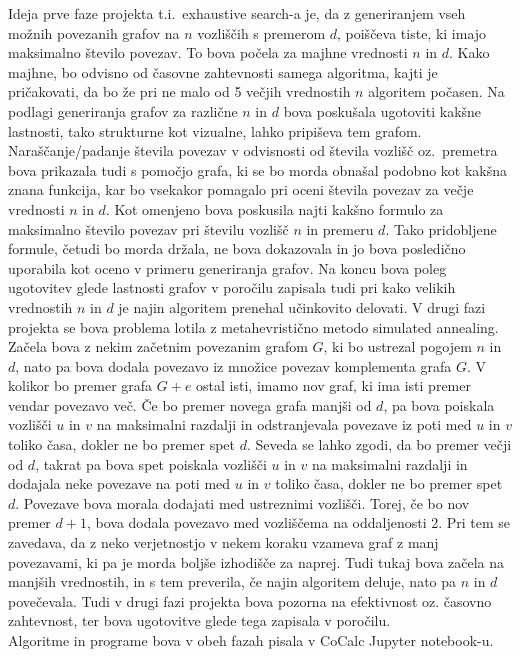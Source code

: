 \documentclass[12pt,a4paper]{amsart}
\theoremstyle{definition} %
\theoremstyle{plain} %
\begin{document}
Ideja prve faze projekta t.i.\ exhaustive search-a je, da z generiranjem vseh možnih povezanih grafov na $n$ vozliščih s premerom $d$, 
poiščeva tiste, ki imajo maksimalno število povezav. To bova počela za majhne vrednosti $n$ in $d$. Kako majhne, bo odvisno od časovne 
zahtevnosti samega algoritma, kajti je pričakovati, da bo že pri ne malo od 5 večjih vrednostih $n$ algoritem počasen. Na podlagi 
generiranja grafov za različne $n$ in $d$ bova poskušala ugotoviti kakšne lastnosti, tako strukturne kot vizualne, lahko pripiševa 
tem grafom. Naraščanje/padanje števila povezav v odvisnosti od števila vozlišč oz.\ premetra bova prikazala tudi s pomočjo grafa, 
ki se bo morda obnašal podobno kot kakšna znana funkcija, kar bo vsekakor pomagalo pri oceni števila povezav za večje vrednosti $n$ 
in $d$. Kot omenjeno bova poskusila najti kakšno formulo za maksimalno število povezav pri številu vozlišč $n$ in premeru $d$. Tako 
pridobljene formule, četudi bo morda držala, ne bova dokazovala in jo bova posledično uporabila kot oceno v primeru generiranja grafov. 
Na koncu bova poleg ugotovitev glede lastnosti grafov v poročilu zapisala tudi pri kako velikih vrednostih $n$ in $d$ je najin algoritem 
prenehal učinkovito delovati. V drugi fazi projekta se bova problema lotila z metahevristično metodo simulated annealing. Začela bova z 
nekim začetnim povezanim grafom $G$, ki bo ustrezal pogojem $n$ in $d$, nato pa bova dodala povezavo iz množice povezav komplementa grafa $G$. 
V kolikor bo premer grafa $G + e$ ostal isti, imamo nov graf, ki ima isti premer vendar povezavo več. Če bo premer novega grafa manjši od $d$, 
pa bova poiskala vozlišči $u$ in $v$ na maksimalni razdalji in odstranjevala povezave iz poti med $u$ in $v$ toliko časa, dokler ne bo premer 
spet $d$. Seveda se lahko zgodi, da bo premer večji od $d$, takrat pa bova spet poiskala vozlišči $u$ in $v$ na maksimalni razdalji in dodajala 
neke povezave na poti med $u$ in $v$ toliko časa, dokler ne bo premer spet $d$. Povezave bova morala dodajati med ustreznimi vozlišči. Torej, 
če bo nov premer $d+1$, bova dodala povezavo med vozliščema na oddaljenosti 2. Pri tem se zavedava, da z neko verjetnostjo v nekem koraku vzameva 
graf z manj povezavami, ki pa je morda boljše izhodišče za naprej. \pagebreak Tudi tukaj bova začela na manjših vrednostih, in s tem preverila, če najin 
algoritem deluje, nato pa $n$ in $d$ povečevala. Tudi v drugi fazi projekta bova pozorna na efektivnost oz. časovno zahtevnost, ter bova ugotovitve 
glede tega zapisala v poročilu.\\
Algoritme in programe bova v obeh fazah pisala v CoCalc Jupyter notebook-u.
\end{document}
